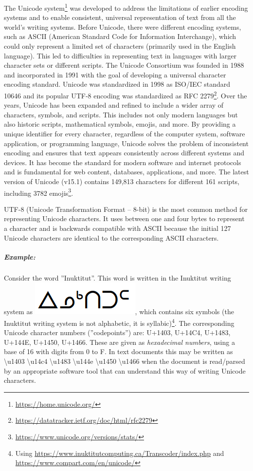 The Unicode system\footnote{\url{https://home.unicode.org/}} was developed to address the limitations of earlier encoding systems and to enable consistent, universal representation of text from all the world's writing systems. Before Unicode, there were different encoding systems, such as ASCII (American Standard Code for Information Interchange), which could only represent a limited set of characters (primarily used in the English language). This led to difficulties in representing text in languages with larger character sets or different scripts. The Unicode Consortium was founded in 1988 and incorporated in 1991 with the goal of developing a universal character encoding standard. Unicode was standardized in 1998 as ISO/IEC standard 10646 and its popular UTF-8 encoding was standardized as RFC 2279\footnote{\url{https://datatracker.ietf.org/doc/html/rfc2279}}. Over the years, Unicode has been expanded and refined to include a wider array of characters, symbols, and scripts. This includes not only modern languages but also historic scripts, mathematical symbols, emojis, and more. By providing a unique identifier for every character, regardless of the computer system, software application, or programming language, Unicode solves the problem of inconsistent encoding and ensures that text appears consistently across different systems and devices. It has become the standard for modern software and internet protocols and  is fundamental for web content, databases, applications, and more. The latest version of Unicode (v15.1) contains 149,813 characters for different 161 scripts, including 3782 emojis\footnote{\url{https://www.unicode.org/versions/stats/}}. 

UTF-8 (Unicode Transformation Format -- 8-bit) is the most common method for representing Unicode characters. It uses between one and four bytes to represent a character and is backwards compatible with ASCII because the initial 127 Unicode characters are identical to the corresponding ASCII characters. 

\subparagraph*{Example:} Consider the word ''Inuktitut''. This word is written in the Inuktitut writing system as \includegraphics[height=1.5\fontcharht\font`\B]{screen2.png}, which contains six symbols (the Inuktitut writing system is not alphabetic, it is syllabic)\footnote{Using \url{https://www.inuktitutcomputing.ca/Transcoder/index.php} and \url{https://www.compart.com/en/unicode/}}. The corresponding Unicode character numbers (''codepoints'') are: U+1403, U+14C4, U+1483, U+144E, U+1450, U+1466. These are given as \emph{hexadecimal numbers}, using a base of 16 with digits from 0 to F. In text documents this may be written as \textbackslash u1403 \textbackslash u14c4 \textbackslash u1483 \textbackslash u144e \textbackslash u1450 \textbackslash u1466 when the document is read/parsed by an appropriate software tool that can understand this way of writing Unicode characters. 

